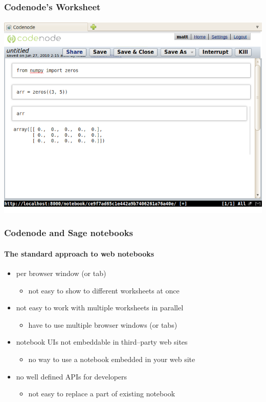 \documentclass{beamer}
\begin{document}
\begin{frame}
    \frametitle{Codenode's Worksheet}
    \framesubtitle{}

    \begin{center}
        \includegraphics[scale=0.45]{images/codenode-worksheet.png}
    \end{center}
\end{frame}

\begin{frame}
    \frametitle{Codenode and Sage notebooks}
    \framesubtitle{The standard approach to web notebooks}

    \begin{itemize}
        \item {} per browser window (or tab)
            \begin{itemize}
                \pause
                \item not easy to show to different worksheets at once
            \end{itemize}
        \pause
        \item not easy to work with multiple worksheets in parallel
            \begin{itemize}
                \pause
                \item have to use multiple browser windows (or tabs)
            \end{itemize}
        \pause
        \item notebook UIs not embeddable in third--party web sites
            \begin{itemize}
                \pause
                \item no way to use a notebook embedded in your web site
            \end{itemize}
        \pause
        \item no well defined APIs for developers
            \begin{itemize}
                \pause
                \item not easy to replace a part of existing notebook
            \end{itemize}
    \end{itemize}
\end{frame}
\end{document}
